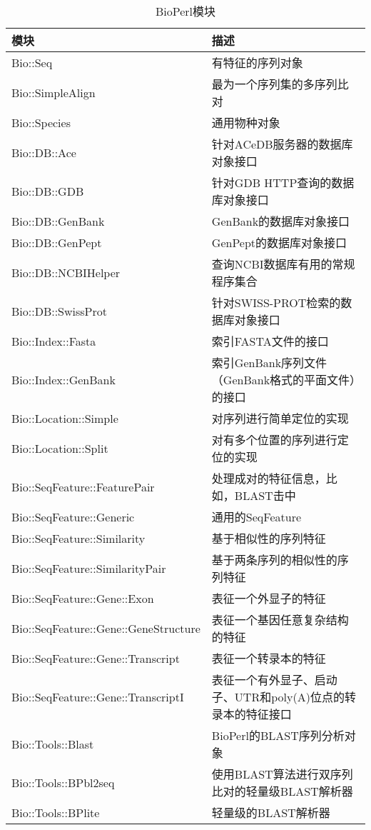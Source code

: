 \begin{table}[!htbp]
  \begin{center}
  \caption{BioPerl模块}
  \label{tab:table12.1}
  \setlength{\tabulinesep}{0.2em}
  \begin{tabu}{X[1.5,l,m]X[3,l,m]}
  \toprule
  模块 & 描述\\
  \midrule
  Bio::Seq & 有特征的序列对象\\
  Bio::SimpleAlign & 最为一个序列集的多序列比对\\
  Bio::Species & 通用物种对象\\
  Bio::DB::Ace & 针对ACeDB服务器的数据库对象接口\\
  Bio::DB::GDB & 针对GDB HTTP查询的数据库对象接口\\
  Bio::DB::GenBank & GenBank的数据库对象接口\\
  Bio::DB::GenPept & GenPept的数据库对象接口\\
  Bio::DB::NCBIHelper & 查询NCBI数据库有用的常规程序集合\\
  Bio::DB::SwissProt & 针对SWISS-PROT检索的数据库对象接口\\
  Bio::Index::Fasta & 索引FASTA文件的接口\\
  Bio::Index::GenBank & 索引GenBank序列文件（GenBank格式的平面文件）的接口\\
  Bio::Location::Simple & 对序列进行简单定位的实现\\
  Bio::Location::Split & 对有多个位置的序列进行定位的实现\\
  Bio::SeqFeature::FeaturePair & 处理成对的特征信息，比如，BLAST击中\\
  Bio::SeqFeature::Generic & 通用的SeqFeature\\
  Bio::SeqFeature::Similarity & 基于相似性的序列特征\\
  Bio::SeqFeature::SimilarityPair & 基于两条序列的相似性的序列特征\\
  Bio::SeqFeature::Gene::Exon & 表征一个外显子的特征\\
  Bio::SeqFeature::Gene::GeneStructure & 表征一个基因任意复杂结构的特征\\
  Bio::SeqFeature::Gene::Transcript & 表征一个转录本的特征\\
  Bio::SeqFeature::Gene::TranscriptI & 表征一个有外显子、启动子、UTR和poly(A)位点的转录本的特征接口\\
  Bio::Tools::Blast & BioPerl的BLAST序列分析对象\\
  Bio::Tools::BPbl2seq & 使用BLAST算法进行双序列比对的轻量级BLAST解析器\\
  Bio::Tools::BPlite & 轻量级的BLAST解析器\\

\end{tabu}
\end{center}
\end{table}
